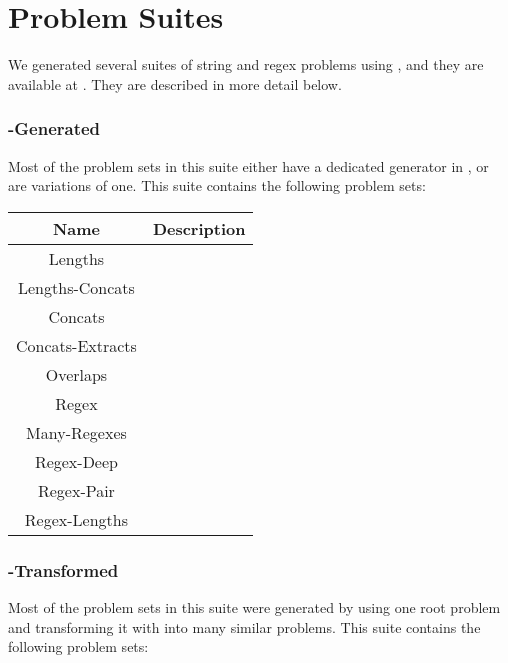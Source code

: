 \section{Problem Suites}

    We generated several suites of string and regex problems using \fuzzer{}, and they are available at \problemRepo{}. They are described in more detail below.

    \subsubsection{\fuzzer{}-Generated}

        Most of the problem sets in this suite either have a dedicated generator in \generator{}, or are variations of one. This suite contains the following problem sets: \\


        \begin{tabular}{|c|c|}
            \hline
            \textbf{Name}    & \textbf{Description} \\ \hline
            Lengths          & \\ \hline
            Lengths-Concats  & \\ \hline
            Concats          & \\ \hline
            Concats-Extracts & \\ \hline
            Overlaps         & \\ \hline
            Regex            & \\ \hline
            Many-Regexes     & \\ \hline
            Regex-Deep       & \\ \hline
            Regex-Pair       & \\ \hline
            Regex-Lengths    & \\ \hline
        \end{tabular}

    \subsubsection{\fuzzer{}-Transformed}

        Most of the problem sets in this suite were generated by using one root problem and transforming it with \transformer{} into many similar problems. This suite contains the following problem sets: \\

